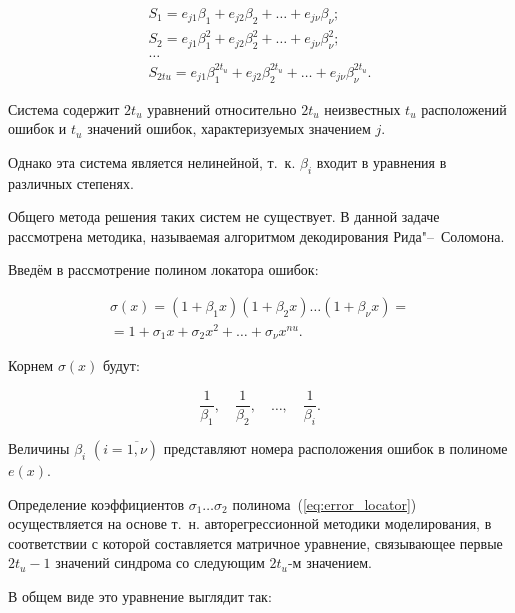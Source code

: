 \begin{equation}
  \label{eq:symptoms}
  \begin{gathered}
    S_1 = e_{j1}\beta_1 + e_{j2}\beta_2 + \ldots +
    e_{j\nu}\beta_{\nu};\\
    S_2 = e_{j1}\beta_1^2 + e_{j2}\beta_2^2 + \ldots +
    e_{j\nu}\beta_{\nu}^2;\\
    \ldots \\
    S_{2tu} = e_{j1}\beta_1^{2t_u} + e_{j2}\beta_2^{2t_u} + \ldots +
    e_{j\nu}\beta_{\nu}^{2t_u}.
  \end{gathered}
\end{equation}

Система содержит $2t_u$ уравнений относительно $2t_u$ неизвестных
$t_u$ расположений ошибок и $t_u$ значений ошибок, характеризуемых
значением $j$.

Однако эта система является нелинейной, т.~к. $\beta_i$ входит в
уравнения в различных степенях.

Общего метода решения таких систем не существует. В данной задаче
рассмотрена методика, называемая алгоритмом декодирования
Рида"--~Соломона.

Введём в рассмотрение полином локатора ошибок:

\begin{multline}
  \label{eq:error_locator}
  \sigma(x) = (1 + \beta_1x)(1 + \beta_2x) \ldots (1 + \beta_{\nu}x) =
  \\ = 1 + \sigma_1x + \sigma_2x^2 + \ldots + \sigma_{\nu}x^{nu}.
\end{multline}

Корнем $\sigma(x)$  будут:

\begin{equation*}
  \frac{1}{\beta_1},\quad \frac{1}{\beta_2},\quad \ldots ,\quad \frac{1}{\beta_i}.
\end{equation*}

Величины $\beta_i$ $(i = \overline{1,\nu})$ представляют номера
расположения ошибок в полиноме $e(x)$.

Определение коэффициентов $\sigma_1 \ldots \sigma_2$
полинома~(\ref{eq:error_locator}) осуществляется на основе
т.~н. авторегрессионной методики моделирования, в соответствии с
которой составляется матричное уравнение, связывающее первые $2t_u-1$
значений синдрома со следующим $2t_u$-м значением.

В общем виде это уравнение выглядит так:


